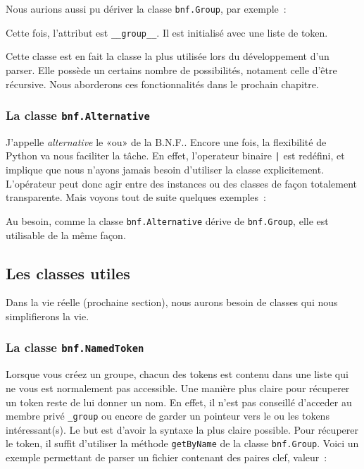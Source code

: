 \documentclass[a4paper]{article}
\newcommand{\insertpython}[1]{%
{\ttfamily}%
}
\newcommand{\fixed}[1]{\texttt{#1}}
\newcommand{\bnf}{B.N.F.}
\begin{document}
                Nous aurions aussi pu dériver la classe \fixed{bnf.Group}, par
                exemple~:
                \insertpython{listings/bnf/ex06.py}
                Cette fois, l'attribut est \fixed{\_\_group\_\_}. Il est initialisé
                avec une liste de token.

                Cette classe est en fait la classe la plus utilisée lors du développement
                d'un parser. Elle possède un certains nombre de possibilités, notament
                celle d'être récursive. Nous aborderons ces fonctionnalités dans le
                prochain chapitre.

            \subsubsection{La classe \fixed{bnf.Alternative}}
                J'appelle \emph{alternative} le «ou» de la \bnf. Encore une fois,
                la flexibilité de Python va nous faciliter la tâche. En effet, l'operateur
                binaire \fixed{|} est redéfini, et implique que nous n'ayons jamais
                besoin d'utiliser la classe explicitement. L'opérateur peut donc agir
                entre des instances ou des classes de façon totalement transparente.
                Mais voyons tout de suite quelques exemples~:
                \insertpython{listings/bnf/ex05.py}

                Au besoin, comme la classe \fixed{bnf.Alternative} dérive de \fixed{bnf.Group},
                elle est utilisable de la même façon.

        \subsection{Les classes utiles}
            Dans la vie réelle (prochaine section), nous aurons besoin de classes qui
            nous simplifierons la vie.

            \subsubsection{La classe \fixed{bnf.NamedToken}}
                Lorsque vous créez un groupe, chacun des tokens est contenu dans une liste
                qui ne vous est normalement pas accessible. Une manière plus claire pour
                récuperer un token reste de lui donner un nom. En effet, il n'est pas conseillé
                d'acceder au membre privé \fixed{\_group} ou encore de garder un pointeur vers
                le ou les tokens intéressant(s). Le but est d'avoir la syntaxe la plus
                claire possible. Pour récuperer le token, il suffit d'utiliser la méthode
                \fixed{getByName} de la classe \fixed{bnf.Group}.
                Voici un exemple permettant de parser un fichier contenant des paires clef, valeur~:
                \insertpython{listings/bnf/ex07.py}
\end{document}

